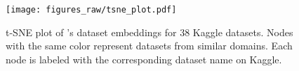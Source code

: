 \begin{figure}
 \centering
  \texttt{[image: figures\_raw/tsne\_plot.pdf]}
  \ncp\ncp\ncp\ncp
  \caption{t-SNE plot of {\sysname}'s dataset embeddings for 38 Kaggle datasets. Nodes with the same color represent datasets from similar domains. Each node is labeled with the corresponding dataset name on Kaggle.}
  \label{tsne_plot}
  \ncp\ncp\ncp\ncp
\end{figure}